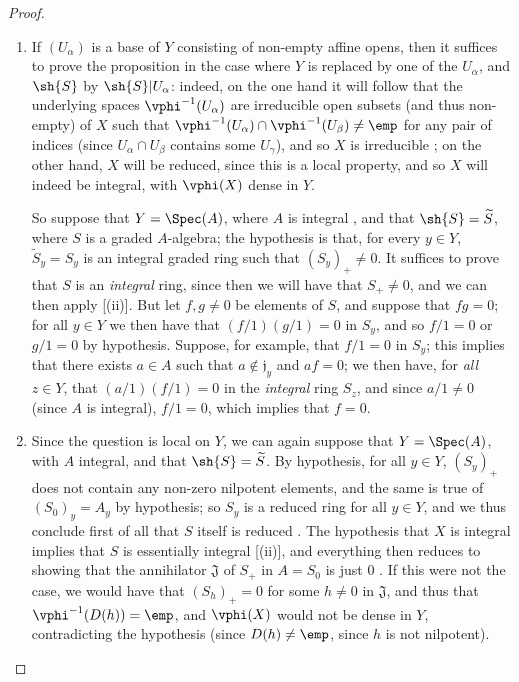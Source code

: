 \begin{proof}
\medskip\noindent
\begin{enumerate}
  \item[(i)] If $(U_\alpha)$ is a base of $Y$ consisting of non-empty affine opens, then it suffices to prove the proposition in the case where $Y$ is replaced by one of the $U_\alpha$, and $\sh{S}$ by $\sh{S}|U_\alpha$:
    indeed, on the one hand it will follow that the underlying spaces $\vphi^{-1}(U_\alpha)$ are irreducible open subsets (and thus non-empty) of $X$ such that $\vphi^{-1}(U_\alpha)\cap\vphi^{-1}(U_\beta)\neq\emp$ for any pair of indices (since $U_\alpha\cap U_\beta$ contains some $U_\gamma$), and so $X$ is irreducible ;
    on the other hand, $X$ will be reduced, since this is a local property, and so $X$ will indeed be integral, with $\vphi(X)$ dense in $Y$.

    So suppose that $Y=\Spec(A)$, where $A$ is integral , and that $\sh{S}=\widetilde{S}$, where $S$ is a graded $A$-algebra;
    the hypothesis is that, for every $y\in Y$, $\widetilde{S}_y=S_y$ is an integral graded ring such that $(S_y)_+\neq0$.
    It suffices to prove that $S$ is an \emph{integral} ring, since then we will have that $S_+\neq0$, and we can then apply [(ii)].
    But let $f,g\neq0$ be elements of $S$, and suppose that $fg=0$;
    for all $y\in Y$ we then have that $(f/1)(g/1)=0$ in $S_y$, and so $f/1=0$ or $g/1=0$ by hypothesis.
    Suppose, for example, that $f/1=0$ in $S_y$;
    this implies that there exists $a\in A$ such that $a\not\in\mathfrak{j}_y$ and $af=0$;
    we then have, for \emph{all} $z\in Y$, that $(a/1)(f/1)=0$ in the \emph{integral} ring $S_z$, and since $a/1\neq0$ (since $A$ is integral), $f/1=0$, which implies that $f=0$.
  \item[(ii)] Since the question is local on $Y$, we can again suppose that $Y=\Spec(A)$, with $A$ integral, and that $\sh{S}=\widetilde{S}$.
    By hypothesis, for all $y\in Y$, $(S_y)_+$ does not contain any non-zero nilpotent elements, and the same is true of $(S_0)_y=A_y$ by hypothesis;
    so $S_y$ is a reduced ring for all $y\in Y$, and we thus conclude first of all that $S$ itself is reduced .
    The hypothesis that $X$ is integral implies that $S$ is essentially integral [(ii)], and everything then reduces to showing that the annihilator $\mathfrak{J}$ of $S_+$ in $A=S_0$ is just $0$ .
    If this were not the case, we would have that $(S_h)_+=0$ for some $h\neq0$ in $\mathfrak{J}$, and thus  that $\vphi^{-1}(D(h))=\emp$, and $\vphi(X)$ would not be dense in $Y$, contradicting the hypothesis (since $D(h)\neq\emp$, since $h$ is not nilpotent).
\end{enumerate}
\end{proof}



